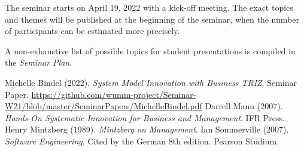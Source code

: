 \documentclass[11pt,a4paper]{article}
\begin{document}
The seminar starts on April 19, 2022 with a kick-off meeting.  The exact
topics and themes will be published at the beginning of the seminar, when the
number of participants can be estimated more precisely.

A non-exhaustive list of possible topics for student presentations is compiled
in the \emph{Seminar Plan}.

\begin{thebibliography}{xxx}
 Michelle Bindel (2022).  \emph{System Model Innovation with
  Business TRIZ}.  Seminar Paper.
  \url{https://github.com/wumm-project/Seminar-W21/blob/master/SeminarPapers/MichelleBindel.pdf}
 Darrell Mann (2007). \emph{Hands-On Systematic Innovation for
  Business and Management}.  IFR Press. 
 Henry Mintzberg (1989).  \emph{Mintzberg on Management}.
 Ian Sommerville (2007).  \emph{Software Engineering}.
  Cited by the German 8th edition. Pearson Studium.
\end{thebibliography}
\end{document}
